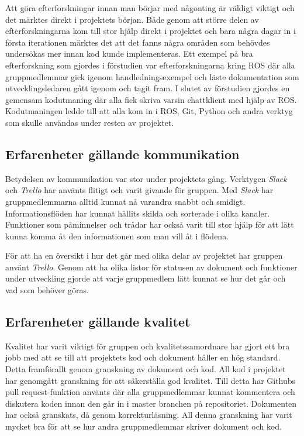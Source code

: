 Att göra efterforskningar innan man börjar med någonting är väldigt viktigt och det märktes direkt i projektets början. Både genom att större delen av efterforskningarna kom till stor hjälp direkt i projektet och bara några dagar in i första iterationen märktes det att det fanns några områden som behövdes undersökas mer innan kod kunde implementeras. Ett exempel på bra efterforskning som gjordes i förstudien var efterforskningarna kring ROS där alla gruppmedlemmar gick igenom handledningsexempel och läste dokumentation som utvecklingsledaren gått igenom och tagit fram. I slutet av förstudien gjordes en gemensam kodutmaning där alla fick skriva varsin chattklient med hjälp av ROS. Kodutmaningen ledde till att alla kom in i ROS, Git, Python och andra verktyg som skulle användas under resten av projektet.


\subsection{Erfarenheter gällande kommunikation}

Betydelsen av kommunikation var stor under projektets gång. Verktygen \textit{Slack} och \textit{Trello} har använts flitigt och varit givande för gruppen. Med \textit{Slack} har gruppmedlemmarna alltid kunnat nå varandra snabbt och smidigt. Informationsflöden har kunnat hållits skilda och sorterade i olika kanaler. Funktioner som påminnelser och trådar har också varit till stor hjälp för att lätt kunna komma åt den informationen som man vill åt i flödena.

För att ha en översikt i hur det går med olika delar av projektet har gruppen använt \textit{Trello}. Genom att ha olika listor för statusen av dokument och funktioner under utveckling gjorde att varje gruppmedlem lätt kunnat se hur det går och vad som behöver göras.


\subsection{Erfarenheter gällande kvalitet}

Kvalitet har varit viktigt för gruppen och kvalitetssamordnare  har gjort ett bra jobb med att se till att projektets kod och dokument håller en hög standard. Detta framförallt genom granskning av dokument och kod. All kod i projektet har genomgått granskning för att säkerställa god kvalitet. Till detta har Githubs pull request-funktion använts där alla gruppmedlemmar kunnat kommentera och diskutera koden innan den går in i master branchen på repositoriet. Dokumenten har också granskats, då genom korrekturläsning. All denna granskning har varit mycket bra för att se hur andra gruppmedlemmar skriver dokument och kod.



